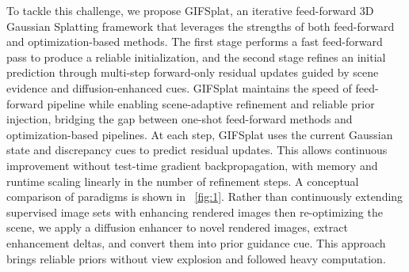 To tackle this challenge, we propose GIFSplat, an iterative feed-forward 3D Gaussian Splatting framework that leverages the strengths of both feed-forward and optimization-based methods. The first stage performs a fast feed-forward pass to produce a reliable initialization, and the second stage refines an initial prediction through multi-step forward-only residual updates guided by scene evidence and diffusion-enhanced cues. 
GIFSplat maintains the speed of feed-forward pipeline while enabling scene-adaptive refinement and reliable prior injection, bridging the gap between one-shot feed-forward methods and optimization-based pipelines.
At each step, GIFSplat uses the current Gaussian state and discrepancy cues to predict residual updates.
This allows continuous improvement without test-time gradient backpropagation, with memory and runtime scaling linearly in the number of refinement steps. A conceptual comparison of paradigms is shown in ~\cref{fig:1}.
Rather than continuously extending supervised image sets with enhancing rendered images then re-optimizing the scene, we apply a diffusion enhancer \cite{wu2025difix3d+} to novel rendered images, extract enhancement deltas, and convert them into prior guidance cue. This approach brings reliable priors without view explosion and followed heavy computation.


